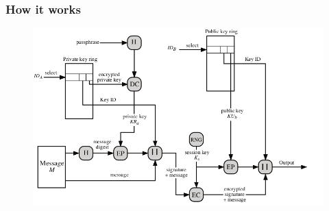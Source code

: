 \documentclass{beamer}
\begin{document}

\begin{frame}
\frametitle{How it works}

\begin{figure}
\includegraphics[width=\textwidth]{PgpMsgGen}
\end{figure}

\end{frame}

\end{document}
